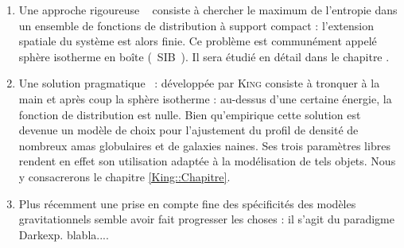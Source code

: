 	\begin{enumerate}
		\item Une approche \og rigoureuse \fg~ consiste à chercher le maximum de l'entropie dans un ensemble de fonctions de distribution à support compact :
			l'extension spatiale du système est alors finie. Ce problème est communément appelé sphère isotherme en boîte (~SIB~). Il sera étudié en détail dans le chapitre \label{SIB::Chapitre}.
			
		\item Une solution \og pragmatique \fg~: développée par \textsc{King} \cite{King-1966AJ}  consiste à tronquer à la main et après coup la sphère isotherme : au-dessus d'une certaine énergie, la fonction de distribution est nulle. Bien qu'empirique cette solution est devenue un modèle de choix pour l'ajustement du profil de densité de nombreux amas globulaires et de galaxies naines. Ses trois paramètres libres rendent en effet son utilisation adaptée à la modélisation de tels objets. Nous y consacrerons le chapitre \ref{King::Chapitre}.
		
		\item Plus récemment une prise en compte fine des spécificités des modèles gravitationnels semble avoir fait progresser les choses : il s'agit du paradigme Darkexp. blabla....
	
	\end{enumerate}

